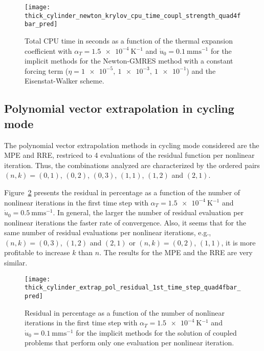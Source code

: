 \begin{figure}
  \texttt{[image: thick\_cylinder\_newton\_krylov\_cpu\_time\_coupl\_strength\_quad4fbar\_pred]}
  \caption{Total CPU time in seconds as a function of the thermal expansion coefficient with \(\alpha_T=\SI{1.5e-4}{\kelvin^{-1}}\) and \(\dot u_0 =\SI{0.1}{\milli\meter\second^{-1}}\) for the implicit methods for the Newton-GMRES method with a constant forcing term (\(\eta=\num{1e-5},\ \num{1e-3},\ \num{1e-1}\)) and the Eisenstat-Walker scheme.}
\label{fig:thick_cylinder_newton_krylov_cpu_time_coupl_strength_quad4fbar_pred}
\end{figure}


\FloatBarrier

\subsection{Polynomial vector extrapolation in cycling mode}

The polynomial vector extrapolation methods in cycling mode considered are the MPE and RRE, restriced to 4 evaluations of the residual function per nonlinear iteration.
Thus, the combinations analyzed are characterized by the ordered pairs \((n,k)=(0,1)\), \((0,2)\), \((0,3)\), \((1,1)\), \((1,2)\) and \((2,1)\).

Figure~\ref{fig:thick_cylinder_extrap_pol_residual_1st_time_step_quad4fbar_pred} presents the residual in percentage as a function of the number of nonlinear iterations in the first time step with \(\alpha_T=\SI{1.5e-4}{\kelvin^{-1}}\) and \(\dot u_0 =\SI{0.5}{\milli\meter\second^{-1}}\).
In general, the larger the number of residual evaluation per nonlinear iterations the faster rate of convergence.
Also, it seems that for the same number of residual evaluations per nonlinear iterations, e.g., \((n,k)=(0,3)\), \((1,2)\) and \((2,1)\) or \((n,k)=(0,2)\), \((1,1)\), it is more profitable to increase \(k\) than \(n\).
The results for the MPE and the RRE are very similar.

\begin{figure}
  \texttt{[image: thick\_cylinder\_extrap\_pol\_residual\_1st\_time\_step\_quad4fbar\_pred]}
  \caption{Residual in percentage as a function of the number of nonlinear iterations in the first time step with \(\alpha_T=\SI{1.5e-4}{\kelvin^{-1}}\) and \(\dot u_0 =\SI{0.1}{\milli\meter\second^{-1}}\) for the implicit methods for the solution of coupled problems that perform only one evaluation per nonlinear iteration.}
\label{fig:thick_cylinder_extrap_pol_residual_1st_time_step_quad4fbar_pred}
\end{figure}

